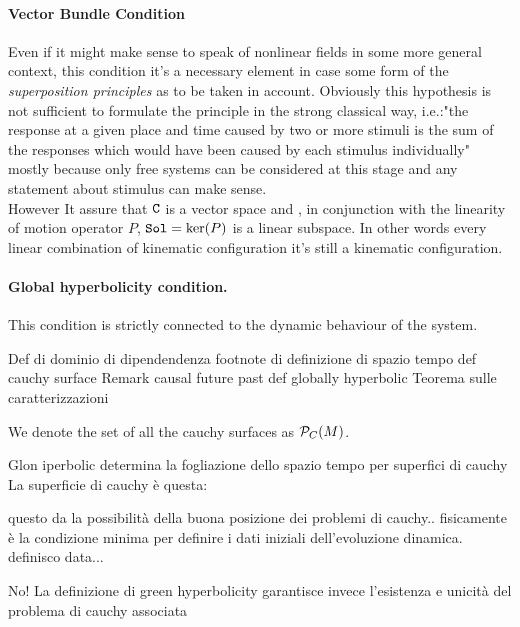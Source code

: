 \documentclass[Main]{subfiles}
\begin{document}
		\paragraph{Vector Bundle Condition}
			Even if it might make sense to speak of nonlinear fields in some more general context, this condition it's a necessary element in case some form of the \emph{superposition principles} as to be taken in account.
			Obviously this hypothesis is not sufficient to formulate the principle in the strong classical way, i.e.:"the response at a given place and time caused by two or more stimuli is the sum of the responses which would have been caused by each stimulus individually" mostly because only free systems can be considered at this stage and any statement about stimulus can make sense.
			\\
			However It assure that $\mathtt{C}$ is a vector space and , in conjunction with the linearity of motion operator $P$, $\mathtt{Sol}= \ker(P)$ is a linear subspace.		
			In other words every linear combination of kinematic configuration it's still a kinematic configuration.

		\paragraph{Global hyperbolicity condition.}
		
			This condition is strictly connected to the dynamic behaviour of the system.
			
			\danger
			Def di dominio di dipendendenza
			footnote di definizione di spazio tempo
			def cauchy surface
			Remark causal future past
			def globally hyperbolic
			Teorema sulle caratterizzazioni
			\begin{notationfix}
				We denote the set of all the cauchy surfaces as $\mathcal{P}_{C}(M)$.
			\end{notationfix}
					

		Glon iperbolic determina la fogliazione dello spazio tempo per superfici di cauchy
		La superficie di cauchy è questa:
		\begin{definition}
		\end{definition}		
		questo da la possibilità della buona posizione dei problemi di cauchy.. fisicamente è la condizione minima per definire i dati iniziali dell'evoluzione dinamica.
		definisco data...
		
	No!		La definizione di green hyperbolicity garantisce invece l'esistenza e unicità del problema di cauchy associata
		
\end{document}
